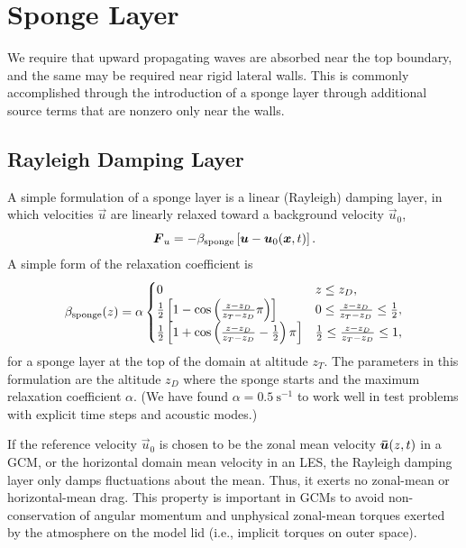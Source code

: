 \documentclass{report}
\begin{document}
\section{Sponge Layer}\label{s:sponge}

We require that upward propagating waves are absorbed near the top boundary, and the same may be required near rigid lateral walls. This is commonly accomplished through the introduction of a sponge layer through additional source terms that are nonzero only near the walls.

\subsection{Rayleigh Damping Layer}

A simple formulation of a sponge layer is a linear (Rayleigh) damping layer, in which velocities $\vec{u}$ are linearly relaxed toward a background velocity $\vec{u}_0$,
\begin{equation*}
\vec{F}_u = -\beta_{\rm sponge} \left[\vec{u} - \vec{u}_0(\vec{x}, t)\right].
\end{equation*}
A simple form of the relaxation coefficient is \citep{durran:1983}
\begin{equation}\label{eq:spongeDurran}
\beta_{\rm sponge}(z) = \alpha
    \begin{cases}
    0 &  z\leq z_D,\\
    \frac{1}{2}\left[1 - \cos\left(\frac{z - z_D}{z_T - z_D}\pi\right) \right] &  0\leq \frac{z - z_D}{z_T - z_D} \leq \frac{1}{2},\\
    \frac{1}{2}\left[1 + \cos\left(\frac{z - z_D}{z_T - z_D} - \frac{1}{2}\right)\pi \right]  &  \frac{1}{2}\leq \frac{z - z_D}{z_T - z_D} \leq 1,\\
    \end{cases}
\end{equation}
for a sponge layer at the top of the domain at altitude $z_T$. The parameters in this formulation are the altitude $z_D$ where the sponge starts and the maximum relaxation coefficient $\alpha$. (We have found $\alpha = 0.5~\mathrm{s^{-1}}$ to work well in test problems with explicit time steps and acoustic modes.) 

If the reference velocity $\vec{u}_0$ is chosen to be the zonal mean velocity $\vec{\Bar u}(z, t)$ in a GCM, or the horizontal domain mean velocity in an LES, the Rayleigh damping layer only damps fluctuations about the mean. Thus, it exerts no zonal-mean or horizontal-mean drag. This property is important in GCMs to avoid non-conservation of angular momentum and unphysical zonal-mean torques exerted by the atmosphere on the model lid (i.e., implicit torques on outer space).
 
\end{document}
